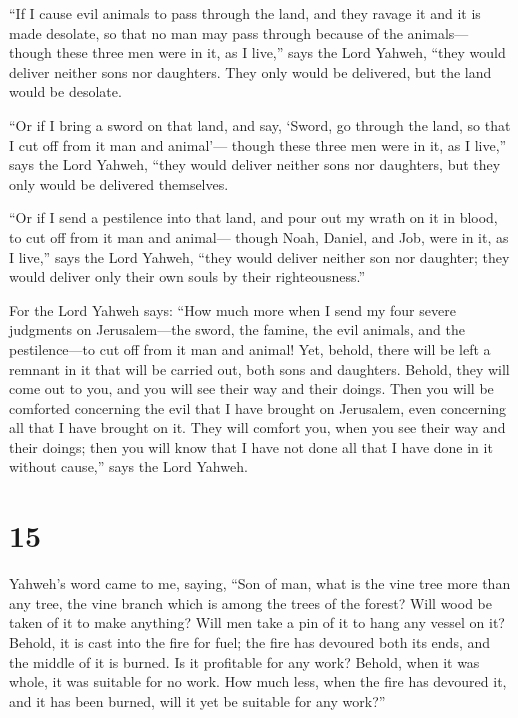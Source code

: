 ``If I cause evil animals to pass through the land, and
they ravage it and it is made desolate, so that no man may pass through
because of the animals---  though these three men were in
it, as I live,'' says the Lord Yahweh, ``they would deliver neither sons
nor daughters. They only would be delivered, but the land would be
desolate.

 ``Or if I bring a sword on that land, and say, `Sword,
go through the land, so that I cut off from it man and animal'---
 though these three men were in it, as I live,'' says the
Lord Yahweh, ``they would deliver neither sons nor daughters, but they
only would be delivered themselves.

 ``Or if I send a pestilence into that land, and pour out
my wrath on it in blood, to cut off from it man and animal---
 though Noah, Daniel, and Job, were in it, as I live,''
says the Lord Yahweh, ``they would deliver neither son nor daughter;
they would deliver only their own souls by their righteousness.''

 For the Lord Yahweh says: ``How much more when I send my
four severe judgments on Jerusalem---the sword, the famine, the evil
animals, and the pestilence---to cut off from it man and animal!
 Yet, behold, there will be left a remnant in it that
will be carried out, both sons and daughters. Behold, they will come out
to you, and you will see their way and their doings. Then you will be
comforted concerning the evil that I have brought on Jerusalem, even
concerning all that I have brought on it.  They will
comfort you, when you see their way and their doings; then you will know
that I have not done all that I have done in it without cause,'' says
the Lord Yahweh.

\hypertarget{section-14}{%
\section{15}\label{section-14}}

 Yahweh's word came to me, saying,  ``Son of
man, what is the vine tree more than any tree, the vine branch which is
among the trees of the forest?  Will wood be taken of it
to make anything? Will men take a pin of it to hang any vessel on it?
 Behold, it is cast into the fire for fuel; the fire has
devoured both its ends, and the middle of it is burned. Is it profitable
for any work?  Behold, when it was whole, it was suitable
for no work. How much less, when the fire has devoured it, and it has
been burned, will it yet be suitable for any work?''

